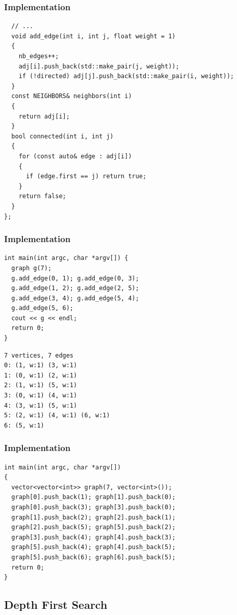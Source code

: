\documentclass{beamer}
\begin{document}
\begin{frame}[containsverbatim]
\frametitle{Implementation}
\scriptsize
\begin{lstlisting}
  // ...
  void add_edge(int i, int j, float weight = 1)
  {
    nb_edges++;
    adj[i].push_back(std::make_pair(j, weight));
    if (!directed) adj[j].push_back(std::make_pair(i, weight));
  }
  const NEIGHBORS& neighbors(int i)
  {
    return adj[i];
  }
  bool connected(int i, int j)
  {
    for (const auto& edge : adj[i])
    {
      if (edge.first == j) return true;
    }
    return false;
  }
};
\end{lstlisting}

\end{frame}

\begin{frame}[containsverbatim]
\frametitle{Implementation}
\scriptsize
\begin{lstlisting}
int main(int argc, char *argv[]) {
  graph g(7);
  g.add_edge(0, 1); g.add_edge(0, 3);
  g.add_edge(1, 2); g.add_edge(2, 5);
  g.add_edge(3, 4); g.add_edge(5, 4);
  g.add_edge(5, 6);
  cout << g << endl;
  return 0;
}
\end{lstlisting}

\begin{verbatim}
7 vertices, 7 edges
0: (1, w:1) (3, w:1)
1: (0, w:1) (2, w:1)
2: (1, w:1) (5, w:1)
3: (0, w:1) (4, w:1)
4: (3, w:1) (5, w:1)
5: (2, w:1) (4, w:1) (6, w:1)
6: (5, w:1)
\end{verbatim}
\end{frame}

\begin{frame}[containsverbatim]
\frametitle{Implementation}
\scriptsize
\begin{lstlisting}
int main(int argc, char *argv[])
{
  vector<vector<int>> graph(7, vector<int>());
  graph[0].push_back(1); graph[1].push_back(0);
  graph[0].push_back(3); graph[3].push_back(0);
  graph[1].push_back(2); graph[2].push_back(1);
  graph[2].push_back(5); graph[5].push_back(2);
  graph[3].push_back(4); graph[4].push_back(3);
  graph[5].push_back(4); graph[4].push_back(5);
  graph[5].push_back(6); graph[6].push_back(5);
  return 0;
}
\end{lstlisting}

\end{frame}

\subsection{Depth First Search}
\end{document}
